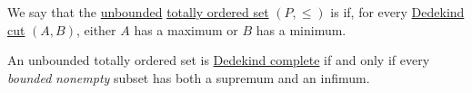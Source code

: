 \begin{definition}\label{def:dedekind_completeness}
  We say that the \hyperref[def:extremal_points/bounds]{unbounded} \hyperref[def:totally_ordered_set]{totally ordered set} \( (P, \leq) \) is  if, for every \hyperref[def:dedekind_cut]{Dedekind cut} \( (A, B) \), either \( A \) has a maximum or \( B \) has a minimum.
\end{definition}

\begin{proposition}\label{thm:dedekind_completeness_unbounded_characterization}
  An unbounded totally ordered set is \hyperref[def:dedekind_completeness]{Dedekind complete} if and only if every \emph{bounded} \emph{nonempty} subset has both a supremum and an infimum.
\end{proposition}
